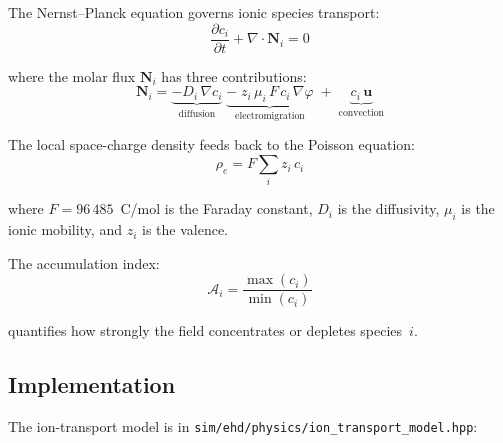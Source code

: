 \documentclass[11pt,a4paper]{article}
\begin{document}
The Nernst--Planck equation governs ionic species transport:
\begin{equation}
  \frac{\partial c_i}{\partial t} + \nabla \cdot \mathbf{N}_i = 0
  \label{eq:nernst_planck}
\end{equation}

where the molar flux $\mathbf{N}_i$ has three contributions:
\begin{equation}
  \mathbf{N}_i = \underbrace{-D_i\,\nabla c_i}_{\text{diffusion}}
    \;\underbrace{-\;z_i\,\mu_i\,F\,c_i\,\nabla\varphi}_{\text{electromigration}}
    \;+\;\underbrace{c_i\,\mathbf{u}}_{\text{convection}}
  \label{eq:flux_np}
\end{equation}

The local space-charge density feeds back to the Poisson equation:
\begin{equation}
  \rho_e = F\sum_{i} z_i\,c_i
  \label{eq:space_charge}
\end{equation}

where $F = 96\,485$~C/mol is the Faraday constant, $D_i$ is the
diffusivity, $\mu_i$ is the ionic mobility, and $z_i$ is the valence.

The accumulation index:
\begin{equation}
  \mathcal{A}_i = \frac{\max(c_i)}{\min(c_i)}
  \label{eq:accum}
\end{equation}

quantifies how strongly the field concentrates or depletes species~$i$.

\subsection{Implementation}

The ion-transport model is in
\texttt{sim/ehd/physics/ion\_transport\_model.hpp}:
\end{document}
